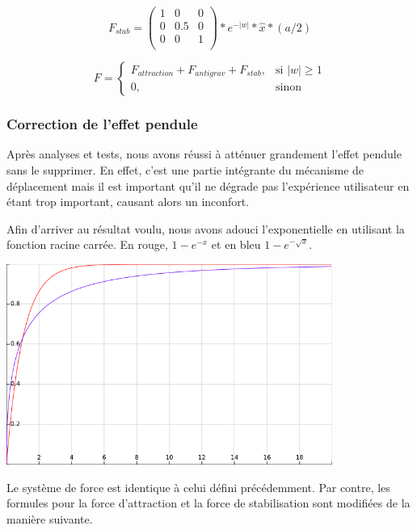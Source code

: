 \documentclass[a4paper]{elsarticle}
\begin{document}
\begin{equation}
    F_{stab} = \left( {\begin{array}{ccc}
   1 & 0 & 0\\
   0 & 0.5 & 0\\
   0 & 0 & 1\\
  \end{array} } \right) * e^{-|w|} * \hat{x} * (a / 2)
\end{equation}

\begin{equation}
    F = 
\begin{cases}
    F_{attraction} + F_{antigrav} + F_{stab},& \text{si } |w| \geq 1\\
    0,              & \text{sinon}
\end{cases}
\end{equation}

\subsubsection{Correction de l'effet pendule}

Après analyses et tests, nous avons réussi à atténuer grandement \og l'effet pendule \fg{} sans le supprimer. En effet, c'est une partie intégrante du mécanisme de déplacement mais il est important qu'il ne dégrade pas l'expérience utilisateur en étant trop important, causant alors un inconfort.

Afin d'arriver au résultat voulu, nous avons \og adouci \fg{} l'exponentielle en utilisant la fonction racine carrée. En rouge, $1-e^{-x}$ et en bleu $1-e^{-\sqrt{x}}$.

\begin{center}
\includegraphics[width=0.8\textwidth]{exp_sqrt.png}
\end{center}

Le système de force est identique à celui défini précédemment. Par contre, les formules pour la force d'attraction et la force de stabilisation sont modifiées de la manière suivante.
\end{document}
